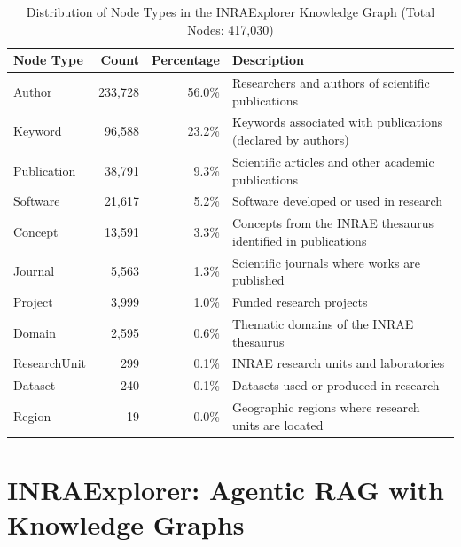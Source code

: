 \documentclass{ecai}
\begin{document}

\begin{table}[t] %
    \centering
    \caption{Distribution of Node Types in the INRAExplorer Knowledge Graph (Total Nodes: 417,030)}
    \label{tab:kg_nodes} %
    \begin{tabular}{@{}lrrp{10cm}@{}}
    \toprule
    Node Type & Count & Percentage & Description \\
    \midrule
    Author & 233,728 & 56.0\% & Researchers and authors of scientific publications \\
    Keyword & 96,588 & 23.2\% & Keywords associated with publications (declared by authors) \\
    Publication & 38,791 & 9.3\% & Scientific articles and other academic publications \\
    Software & 21,617 & 5.2\% & Software developed or used in research \\
    Concept & 13,591 & 3.3\% & Concepts from the INRAE thesaurus identified in publications \\
    Journal & 5,563 & 1.3\% & Scientific journals where works are published \\
    Project & 3,999 & 1.0\% & Funded research projects \\
    Domain & 2,595 & 0.6\% & Thematic domains of the INRAE thesaurus \\
    ResearchUnit & 299 & 0.1\% & INRAE research units and laboratories \\
    Dataset & 240 & 0.1\% & Datasets used or produced in research \\
    Region & 19 & 0.0\% & Geographic regions where research units are located \\
    \bottomrule
    \end{tabular}
\end{table}


\section{INRAExplorer: Agentic RAG with Knowledge Graphs}
\end{document}
